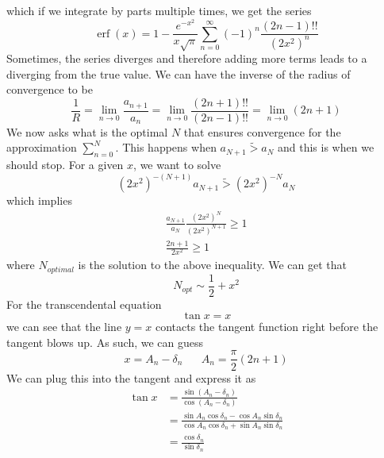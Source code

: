 \documentclass{article}
\newcommand{\twen}{\hspace{20pt}}
\begin{document}
which if we integrate by parts multiple times, we get the series 
\begin{equation*}
    \operatorname{erf}(x)=1-\frac{e^{-x^2}}{x\sqrt \pi } \sum^\infty_{n=0}(-1)^n\frac{(2n-1)!!}{(2x^2)^n}
\end{equation*}
Sometimes, the series diverges and therefore adding more terms leads to a diverging from the true value. We can have the inverse of the radius of convergence to be 
\begin{equation*}
    \frac{1}{R}=\lim_{n\rightarrow 0} \frac{a_{n+1}}{a_n} =\lim_{n\rightarrow 0}\frac{(2n+1)!!}{(2n-1)!!} =\lim_{n\rightarrow 0}(2n+1)
\end{equation*}
We now asks what is the optimal $N$ that ensures convergence for the approximation $\sum^N_{n=0}$. This happens when $a_{N+1}\tilde >{} a_N$ and this is when we should stop. For a given $x$, we want to solve 
\begin{equation*}
    (2x^2)^{-(N+1)}a_{N+1} \tilde > (2x^2)^{-N}a_N
\end{equation*}
which implies \begin{equation*}
    \begin{split}
        \frac{a_{N+1}}{a_N}\frac{(2x^2)^N}{(2x^2)^{N+1}} \geq 1 \\
        \frac{2n+1}{2x^2}\geq 1
    \end{split}
\end{equation*}
where $N_{optimal}$ is the solution to the above inequality. We can get that 
\begin{equation*}
    N_{opt}\sim\frac{1}{2}+x^2
\end{equation*}
For the transcendental equation 
\begin{equation*}
    \tan x=x
\end{equation*}
we can see that the line $y=x$ contacts the tangent function right before the tangent blows up. As such, we can guess 
\begin{equation*}
    x=A_n-\delta_n \twen A_n=\frac{\pi}{2}(2n+1)
\end{equation*}
We can plug this into the tangent and express it as 
\begin{equation*}
    \begin{split}
        \tan x &=\frac{\sin(A_n-\delta _n)}{\cos(A_n-\delta _n)}  \\
        &=\frac{\sin A_n\cos \delta_n -\cos A_n \sin \delta_n}{\cos A_n \cos\delta_n +\sin A_n \sin \delta_n} \\
        &= \frac{\cos \delta_n}{\sin \delta_n}
    \end{split}
\end{equation*}
\end{document}
